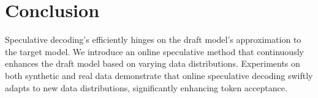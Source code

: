 \section{Conclusion}
Speculative decoding's efficiently hinges on the draft model's approximation to the target model.
We introduce an online speculative method that continuously enhances the draft model based on varying data distributions. Experiments on both synthetic and real data demonstrate that online speculative decoding swiftly adapts to new data distributions, significantly enhancing token acceptance.